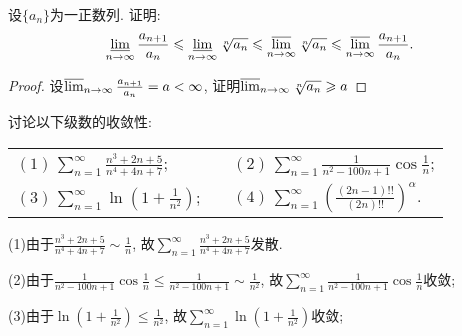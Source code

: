 \begin{quiza}
\woestar 设\(\{a_n\}\)为一正数列. 证明:\[\varliminf_{n\rightarrow\infty}\frac{a_{n+1}}{a_n}\leqslant\varliminf_{n\rightarrow\infty}\sqrt[n]{a_n}\leqslant\varlimsup_{n\rightarrow\infty}\sqrt[n]{a_n}\leqslant\varlimsup_{n\rightarrow\infty}\frac{a_{n+1}}{a_n}.\] 
\begin{proof}
设\(\varlimsup_{n\rightarrow\infty}\frac{a_{n+1}}{a_n}=a<\infty\), 证明\(\varlimsup_{n\rightarrow\infty}\sqrt[n]{a_n}\geqslant a\)
\end{proof}
\woe 讨论以下级数的收敛性: \vspace{8pt}\\
\begin{tabular}{lcl}
\((1)\,\sum_{n=1}^{\infty}\frac{n^3+2n+5}{n^4+4n+7}\);&\qquad\qquad\qquad&\((2)\,\sum_{n=1}^{\infty}\frac{1}{n^2-100n+1}\cos\frac{1}{n}\);\vspace{0.3cm}\\
\((3)\,\sum_{n=1}^{\infty}\ln\left(1+\frac{1}{n^2}\right)\);&&\((4)\,\sum_{n=1}^{\infty}\left(\frac{(2n-1)!!}{(2n)!!}\right)^{\alpha}\).
\end{tabular}
\begin{solution}
(1)由于\(\frac{n^3+2n+5}{n^4+4n+7}\sim\frac{1}{n}\), 故\(\sum_{n=1}^{\infty}\frac{n^3+2n+5}{n^4+4n+7}\)发散.

(2)由于\(\frac{1}{n^2-100n+1}\cos\frac{1}{n}\leqslant\frac{1}{n^2-100n+1}\sim\frac{1}{n^2}\), 故\(\sum_{n=1}^{\infty}\frac{1}{n^2-100n+1}\cos\frac{1}{n}\)收敛; 

(3)由于\(\ln\left(1+\frac{1}{n^2}\right)\leqslant\frac{1}{n^2}\), 故\(\sum_{n=1}^{\infty}\ln\left(1+\frac{1}{n^2}\right)\)收敛;


\end{solution}
\end{quiza}

